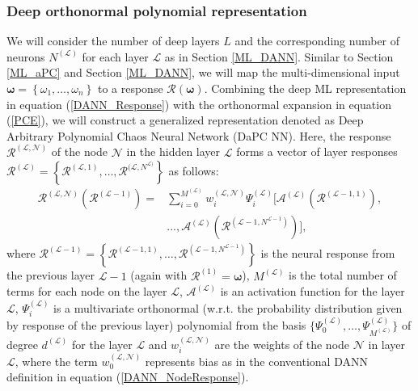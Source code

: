 \documentclass[a4paper,fleqn]{article}
\newcommand{\rw}[1]{\textcolor{blue}{#1}}
\newcommand{\del}[1]{\textcolor{red}{\sout{#1}}}
\renewcommand{\del}[1]{}
\renewcommand{\rw}[1]{#1}
\begin{document}
\subsubsection{Deep orthonormal polynomial representation}
\label{Deep_OPR}
We will consider the number of deep layers $L$ and the corresponding number of \del{deep} neurons $N^{(\mathcal{L})}$ for each layer $\mathcal{L}$ as in Section \ref{ML_DANN}. Similar to Section \ref{ML_aPC} and Section \ref{ML_DANN}, we will map the multi-dimensional input $\bm{\omega}=\left\{\omega_1,\ldots,\omega_n \right\}$ to a response $\mathcal{R}(\bm{\omega})$. Combining the deep ML representation in equation (\ref{DANN_Response}) with the orthonormal expansion in equation (\ref{PCE}), we will construct a generalized representation denoted as Deep Arbitrary Polynomial Chaos Neural Network (DaPC NN). Here, the response $\mathcal{R}^{(\mathcal{L},\mathcal{N})}$ of the \del{deep} node $\mathcal{N}$ in the hidden layer $\mathcal{L}$ forms a vector of layer responses $\bm{\mathcal{R}}^{(\mathcal{L})}=\left\{\mathcal{R}^{(\mathcal{L},1)},\ldots,\mathcal{R}^{(\mathcal{L},N^{\mathcal{L})}}\right\}$ as follows: 
%
%
%
\begin{equation}
\label{DaPC_NodeResponse}
\begin{aligned}
\mathcal{R}^{(\mathcal{L},\mathcal{N})}\left(\bm{\mathcal{R}}^{(\mathcal{L}-1)}\right) = &  \sum_{i=0}^{M^{(\mathcal{L})}} w^{(\mathcal{L},\mathcal{N})}_{i} \Psi^{(\mathcal{L})}_i 
\Big[\mathcal{A}^{(\mathcal{L})}(\mathcal{R}^{(\mathcal{L}-1,1)}),\\  
& ...,\mathcal{A}^{(\mathcal{L})}(\mathcal{R}^{(\mathcal{L}-1,N^{\mathcal{L}-1})})
\Big],
\end{aligned}  
\end{equation}
%
where \rw{$\bm{\mathcal{R}}^{(\mathcal{L}-1)}=\left\{\mathcal{R}^{(\mathcal{L}-1,1)},\ldots,\mathcal{R}^{(\mathcal{L}-1,N^{\mathcal{L}-1})}\right\}$} is the neural response from the previous layer $\mathcal{L}-1$ (again with $\bm{\mathcal{R}}^{(1)} =\bm{\omega}$), $M^{(\mathcal{L})}$ is the total number of terms for each node on the layer $\mathcal{L}$, $\mathcal{A}^{(\mathcal{L})}$ is an activation function for the layer $\mathcal{L}$, $\Psi^{(\mathcal{L})}_i$ is a multivariate orthonormal \rw{(w.r.t. the probability distribution given by response of the previous layer)} polynomial from the basis $\big\{ \Psi^{(\mathcal{L})}_0,\ldots, \Psi^{(\mathcal{L})}_{M^{(\mathcal{L})}}\big\}$ of degree $d^{(\mathcal{L})}$ for the layer $\mathcal{L}$ and $w^{(\mathcal{L},\mathcal{N})}_{i}$ are the weights of the node $\mathcal{N}$ in layer $\mathcal{L}$, where the term $w^{(\mathcal{L},\mathcal{N})}_{0}$ represents bias as in the conventional DANN definition in equation (\ref{DANN_NodeResponse}).
\end{document}
